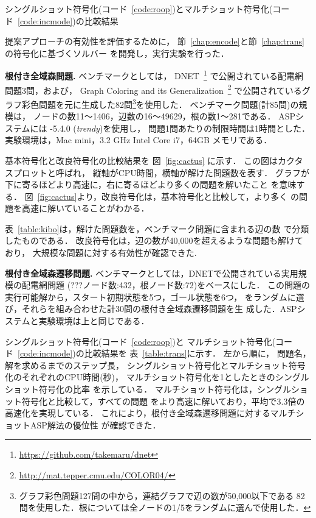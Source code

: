 \begin{table}[t]
  \centering
  \caption{シングルショット符号化(コード~\ref{code:roop})とマルチショット符号化(コード~\ref{code:incmode})の比較結果}
  \label{table:trans}
  
\end{table}

提案アプローチの有効性を評価するために，
節~\ref{chap:encode}と節~\ref{chap:trans}の符号化に基づくソルバー
を開発し，実行実験を行った．

\textbf{根付き全域森問題.}
ベンチマークとしては，
DNET~\footnote{\url{https://github.com/takemaru/dnet}}
で公開されている配電網問題3問，および，
Graph Coloring and its Generalization~\footnote{\url{http://mat.tepper.cmu.edu/COLOR04/}}
で公開されているグラフ彩色問題を元に生成した82問\footnote{%
グラフ彩色問題127問の中から，連結グラフで辺の数が50,000以下である
82問を使用した．根については全ノードの1/5をランダムに選んで使用した．
}を使用した．
ベンチマーク問題(計85問)の規模は，
ノードの数11〜1406，辺数の16〜49629，根の数1〜281である．
%
ASPシステムには {\clingo}-5.4.0 (\textit{trendy})を使用し，
問題1問あたりの制限時間は1時間とした．
実験環境は，Mac mini，3.2 GHz Intel Core i7，64GB メモリである．

基本符号化と改良符号化の比較結果を
図~\ref{fig:cactus}
に示す．
この図はカクタスプロットと呼ばれ，
縦軸がCPU時間，横軸が解けた問題数を表す．
グラフが下に寄るほどより高速に，右に寄るほどより多くの問題を解いたこと
を意味する．
図~\ref{fig:cactus}より，改良符号化は，基本符号化と比較して，より多く
の問題を高速に解いていることがわかる．

表~\ref{table:kibo}は，解けた問題数を，ベンチマーク問題に含まれる辺の数
で分類したものである．
改良符号化は，辺の数が40,000を超えるような問題も解けており，
大規模な問題に対する有効性が確認できた. 

\textbf{根付き全域森遷移問題.}
ベンチマークとしては，DNETで公開されている実用規模の配電網問題
(???ノード数:432，根ノード数:72)をベースにした．
この問題の実行可能解から，スタート初期状態を5つ，ゴール状態を6つ，
をランダムに選び，それらを組み合わせた計30問の根付き全域森遷移問題を生
成した．ASPシステムと実験環境は上と同じである．

シングルショット符号化(コード~\ref{code:roop})と
マルチショット符号化(コード~\ref{code:incmode})の比較結果を
表~\ref{table:trans}に示す．
左から順に，
問題名，
解を求めるまでのステップ長，
シングルショット符号化とマルチショット符号化のそれぞれのCPU時間(秒)，
マルチショット符号化を1としたときのシングルショット符号化の比率
を示している．
マルチショット符号化は，シングルショット符号化と比較して，すべての問題
をより高速に解いており，平均で3.3倍の高速化を実現している．
これにより，根付き全域森遷移問題に対するマルチショットASP解法の優位性
が確認できた．

